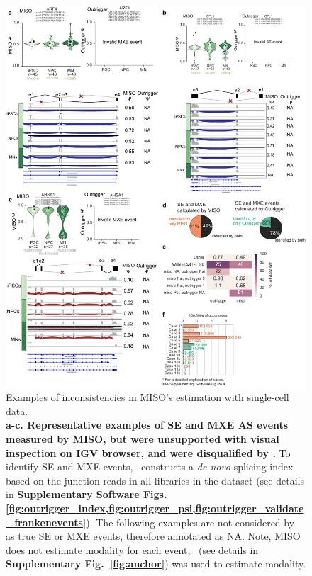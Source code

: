 \begin{figure}
  \centering
  \includegraphics[width=5.8in]{figures/invalid_miso}
  \caption[Examples of inconsistencies in MISO's estimation with single-cell data.]{Examples of inconsistencies in MISO's estimation with single-cell data.\\
\textbf{a-c. Representative examples of SE and MXE AS events measured by MISO, but were unsupported with visual inspection on IGV browser, and were disqualified by \outrigger.} To identify SE and MXE events, \outrigger\, constructs a \emph{de novo} splicing index based on the junction reads in all libraries in the dataset (see details in \textbf{Supplementary Software Figs. \ref{fig:outrigger_index,fig:outrigger_psi,fig:outrigger_validate_frankenevents}}). The following examples are not considered by \outrigger as true SE or MXE events, therefore annotated as NA. Note, MISO does not estimate modality for each event, \anchor\, (see details in \textbf{Supplementary Fig.~\ref{fig:anchor}}) was used to estimate modality.\\
}
\end{figure}
